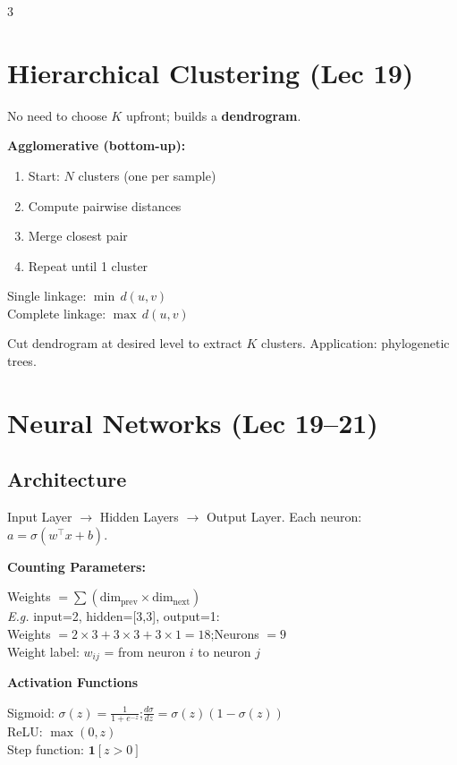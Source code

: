 \documentclass[8pt,letterpaper]{extarticle}
\begin{document}
\begin{multicols}{3}
\section{Hierarchical Clustering (Lec 19)}

No need to choose $K$ upfront; builds a \textbf{dendrogram}.

\textbf{Agglomerative (bottom-up):}
\begin{enumerate}
  \item Start: $N$ clusters (one per sample)
  \item Compute pairwise distances
  \item Merge closest pair
  \item Repeat until 1 cluster
\end{enumerate}
\begin{formulabox}
Single linkage: $\min\, d(u,v)$\\
Complete linkage: $\max\, d(u,v)$
\end{formulabox}
Cut dendrogram at desired level to extract $K$ clusters. Application: phylogenetic trees.

\section{Neural Networks (Lec 19--21)}

\subsection{Architecture}
Input Layer $\to$ Hidden Layers $\to$ Output Layer. Each neuron: $a = \sigma(w^\top x + b)$.

\textbf{Counting Parameters:}
\begin{formulabox}
Weights $= \sum(\text{dim}_\text{prev} \times \text{dim}_\text{next})$\\
\textit{E.g.} input=2, hidden=[3,3], output=1:\\
Weights $= 2{\times}3 + 3{\times}3 + 3{\times}1 = 18$;\quad Neurons $= 9$\\
Weight label: $w_{ij}$ = from neuron $i$ to neuron $j$
\end{formulabox}

\textbf{Activation Functions}
\begin{formulabox}
Sigmoid: $\sigma(z) = \frac{1}{1+e^{-z}}$;\quad $\frac{d\sigma}{dz} = \sigma(z)(1-\sigma(z))$\\
ReLU: $\max(0,z)$ \\
Step function: $\mathbf{1}[z>0]$ \quad [Perceptron]
\end{formulabox}


\end{multicols}
\end{document}
